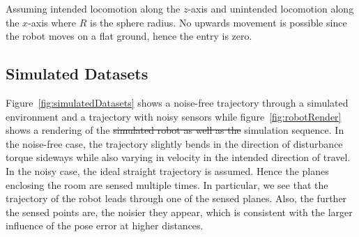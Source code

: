 \documentclass[5p]{elsarticle}
\providecommand{\DIFdeltex}[1]{{\protect\color{red}\sout{#1}}}                      %
\providecommand{\DIFdelbegin}{} %
\providecommand{\DIFdelend}{} %
\providecommand{\DIFdel}[1]{\texorpdfstring{\DIFdeltex{#1}}{}} %
\begin{document}
Assuming intended locomotion along the $z$-axis and unintended locomotion along the $x$-axis where $R$ is the sphere radius.
No upwards movement is possible since the robot moves on a flat ground, hence the entry is zero.

\subsection{Simulated Datasets}

Figure~\ref{fig:simulatedDatasets} shows a noise-free trajectory through a simulated environment and a trajectory with noisy sensors while figure~\ref{fig:robotRender} shows a rendering of the \DIFdelbegin \DIFdel{simulated robot as well as the }\DIFdelend simulation sequence.
In the noise-free case, the trajectory slightly bends in the direction of disturbance torque sideways while also varying in velocity in the intended direction of travel.
In the noisy case, the ideal straight trajectory is assumed.
Hence the planes enclosing the room are sensed multiple times. 
In particular, we see that the trajectory of the robot leads through one of the sensed planes. 
Also, the further the sensed points are, the noisier they appear, which is consistent with the larger influence of the pose error at higher distances.  
\end{document}
